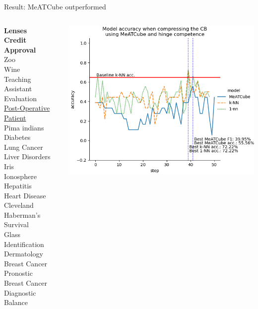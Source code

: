 \documentclass[]{beamer}
\begin{document}
\begin{frame}{Result: MeATCube outperformed}
    \begin{columns}
        \begin{column}{.35\textwidth}
            {\smaller\smaller
            \textbf{Lenses} \\
            \textbf{Credit Approval} \\
            Zoo \\
            Wine \\
            Teaching Assistant Evaluation \\
            \underline{Post-Operative Patient} \\
            Pima indians Diabetes \\
            Lung Cancer \\
            Liver Disorders \\
            Iris \\
            Ionosphere \\
            Hepatitis \\
            Heart Disease Cleveland \\
            Haberman's Survival \\
            Glass Identification \\
            Dermatology \\
            Breast Cancer Pronostic \\
            Breast Cancer Diagnostic \\
            Balance\\
            ~}
        \end{column}
        \begin{column}{.65\textwidth}
            \includegraphics[width=.8\textwidth]{../results/figs/post+operative+patient.png}

\end{column}
\end{columns}
\end{frame}
\end{document}
